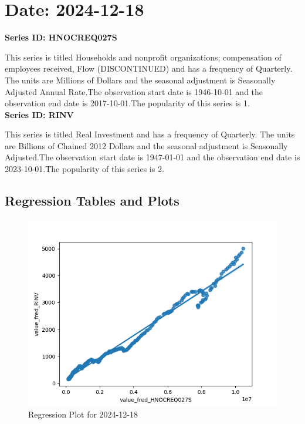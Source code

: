 \section{Date: 2024-12-18}
\noindent \textbf{Series ID: HNOCREQ027S} 

\noindent This series is titled Households and nonprofit organizations; compensation of employees received, Flow (DISCONTINUED) and has a frequency of Quarterly. The units are Millions of Dollars and the seasonal adjustment is Seasonally Adjusted Annual Rate.The observation start date is 1946-10-01 and the observation end date is 2017-10-01.The popularity of this series is 1. \\ 

\noindent \textbf{Series ID: RINV} 

\noindent This series is titled Real Investment and has a frequency of Quarterly. The units are Billions of Chained 2012 Dollars and the seasonal adjustment is Seasonally Adjusted.The observation start date is 1947-01-01 and the observation end date is 2023-10-01.The popularity of this series is 2. \\ 

\subsection{Regression Tables and Plots}


\begin{figure}
\centering
\includegraphics[scale = 0.9]{plots/plot_2024-12-18.png}
\caption{Regression Plot for 2024-12-18}
\end{figure}
\newpage
